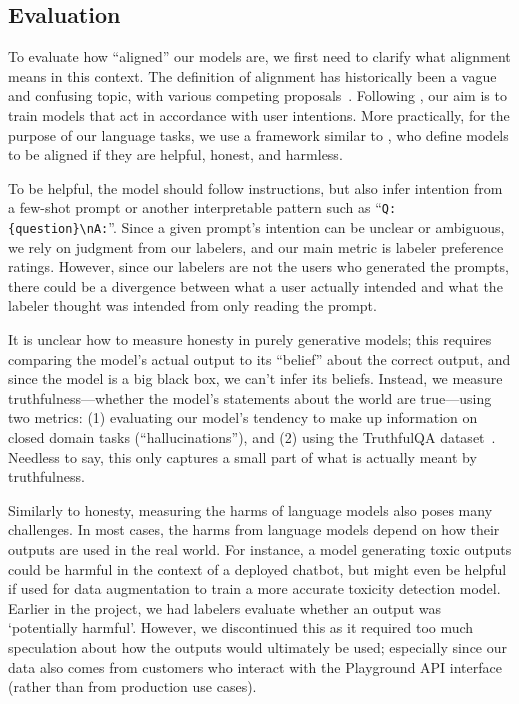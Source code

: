 \subsection{Evaluation}
\label{sec:evaluation}

To evaluate how ``aligned'' our models are, we first need to clarify what alignment means in this context. The definition of alignment has historically been a vague and confusing topic, with various competing proposals~\citep{chen2021evaluating,leike2018scalable,gabriel2020artificial}. Following \citet{leike2018scalable}, our aim is to train models that act in accordance with user intentions. More practically, for the purpose of our language tasks, we use a framework similar to \citet{askell2021general}, who define models to be aligned if they are helpful, honest, and harmless.

To be helpful, the model should follow instructions, but also infer intention from a few-shot prompt or another interpretable pattern such as ``\texttt{Q: \{question\}\textbackslash nA:}''. Since a given prompt's intention can be unclear or ambiguous, we rely on judgment from our labelers, and our main metric is labeler preference ratings. However, since our labelers are not the users who generated the prompts, there could be a divergence between what a user actually intended and what the labeler thought was intended from only reading the prompt.

It is unclear how to measure honesty in purely generative models; this requires comparing the model's actual output to its ``belief'' about the correct output, and since the model is a big black box, we can't infer its beliefs. Instead, we measure truthfulness---whether the model's statements about the world are true---using two metrics: (1) evaluating our model's tendency to make up information on closed domain tasks (``hallucinations''), and (2) using the TruthfulQA dataset~\citep{lin2021truthfulqa}. Needless to say, this only captures a small part of what is actually meant by truthfulness.

Similarly to honesty, measuring the harms of language models also poses many challenges. In most cases, the harms from language models depend on how their outputs are used in the real world. For instance, a model generating toxic outputs could be harmful in the context of a deployed chatbot, but might even be helpful if used for data augmentation to train a more accurate toxicity detection model. Earlier in the project, we had labelers evaluate whether an output was ‘potentially harmful'. However, we discontinued this as it required too much speculation about how the outputs would ultimately be used; especially since our data also comes from customers who interact with the Playground API interface (rather than from production use cases).

